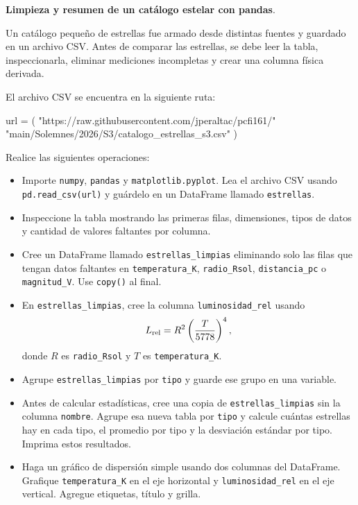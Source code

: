 \providecommand{\Needspace}[1]{}
\Needspace{8\baselineskip}
\item \textbf{Limpieza y resumen de un catálogo estelar con pandas}.
\nopagebreak[4]

\begin{tcolorbox}[colback=blue!2!white,colframe=blue!55!black,title={Enunciado},
                  before skip=3pt,after skip=5pt,boxsep=3pt,top=3pt,bottom=3pt,
                  breakable]
\small
\raggedright
Un catálogo pequeño de estrellas fue armado desde distintas fuentes y guardado
en un archivo CSV. Antes de comparar las estrellas, se debe leer la tabla,
inspeccionarla, eliminar mediciones incompletas y crear una columna física
derivada.

El archivo CSV se encuentra en la siguiente ruta:

\begin{pythonjupyter}
url = (
    "https://raw.githubusercontent.com/jperaltac/pcfi161/"
    "main/Solemnes/2026/S3/catalogo_estrellas_s3.csv"
)
\end{pythonjupyter}

Realice las siguientes operaciones:

\begin{itemize}
\setlength{\topsep}{4pt}
\setlength{\itemsep}{3pt}
\setlength{\parsep}{0pt}
\item[(a)] Importe \texttt{numpy}, \texttt{pandas} y \texttt{matplotlib.pyplot}.
Lea el archivo CSV usando \texttt{pd.read\_csv(url)} y guárdelo en un DataFrame
llamado \texttt{estrellas}.
\item[(b)] Inspeccione la tabla mostrando las primeras filas, dimensiones, tipos
de datos y cantidad de valores faltantes por columna.
\item[(c)] Cree un DataFrame llamado \texttt{estrellas\_limpias} eliminando solo
las filas que tengan datos faltantes en
\texttt{temperatura\_K}, \texttt{radio\_Rsol}, \texttt{distancia\_pc} o
\texttt{magnitud\_V}. Use \texttt{copy()} al final.
\item[(d)] En \texttt{estrellas\_limpias}, cree la columna
\texttt{luminosidad\_rel} usando
\[
L_{\rm rel}=R^2\left(\frac{T}{5778}\right)^4,
\]
donde \(R\) es \texttt{radio\_Rsol} y \(T\) es \texttt{temperatura\_K}.
\item[(e)] Agrupe \texttt{estrellas\_limpias} por \texttt{tipo} y guarde ese
grupo en una variable.
\item[(f)] Antes de calcular estadísticas, cree una copia de
\texttt{estrellas\_limpias} sin la columna \texttt{nombre}. Agrupe esa nueva
tabla por \texttt{tipo} y calcule cuántas estrellas hay en cada tipo, el
promedio por tipo y la desviación estándar por tipo. Imprima estos resultados.
\item[(g)] Haga un gráfico de dispersión simple usando dos columnas del
DataFrame. Grafique \texttt{temperatura\_K} en el eje horizontal y
\texttt{luminosidad\_rel} en el eje vertical. Agregue etiquetas, título y
grilla.
\end{itemize}
\end{tcolorbox}

